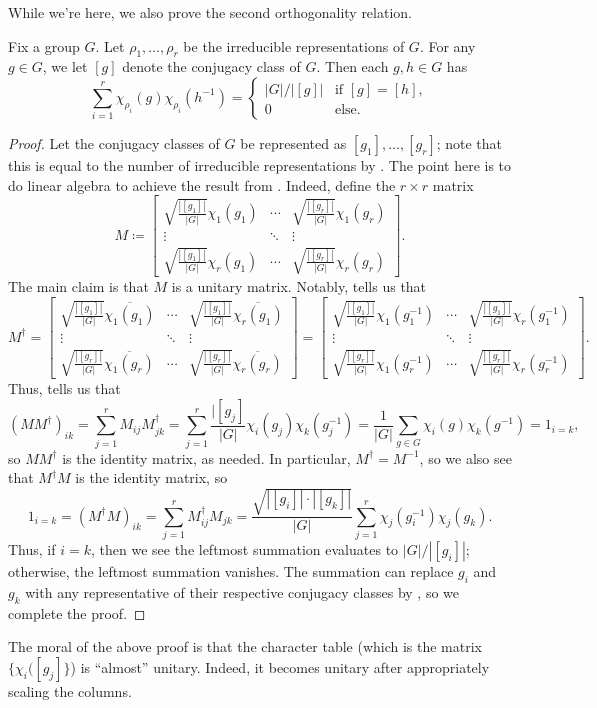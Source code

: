 \documentclass[../main.tex]{subfiles}
\begin{document}
While we're here, we also prove the second orthogonality relation.
\begin{corollary}
	Fix a group $G$. Let $\rho_1,\ldots,\rho_r$ be the irreducible representations of $G$. For any $g\in G$, we let $[g]$ denote the conjugacy class of $G$. Then each $g,h\in G$ has
	\[\sum_{i=1}^r\chi_{\rho_i}(g)\chi_{\rho_i}\left(h^{-1}\right)=\begin{cases}
		|G|/|[g]| & \text{if }[g]=[h], \\
		0 & \text{else}.
	\end{cases}\]
\end{corollary}
\begin{proof}
	Let the conjugacy classes of $G$ be represented as $[g_1],\ldots,[g_r]$; note that this is equal to the number of irreducible representations by . The point here is to do linear algebra to achieve the result from . Indeed, define the $r\times r$ matrix
	\[M\coloneqq\begin{bmatrix}
		\sqrt{\frac{|[g_1]|}{|G|}}\chi_1(g_1) & \cdots & \sqrt{\frac{|[g_r]|}{|G|}}\chi_1(g_r) \\
		\vdots & \ddots & \vdots \\
		\sqrt{\frac{|[g_1]|}{|G|}}\chi_r(g_1) & \cdots & \sqrt{\frac{|[g_r]|}{|G|}}\chi_r(g_r)
	\end{bmatrix}.\]
	The main claim is that $M$ is a unitary matrix. Notably,  tells us that
	\[M^\dagger=\begin{bmatrix}
		\sqrt{\frac{|[g_1]|}{|G|}}\overline{\chi_1(g_1)} & \cdots & \sqrt{\frac{|[g_1]|}{|G|}}\overline{\chi_r(g_1)} \\
		\vdots & \ddots & \vdots \\
		\sqrt{\frac{|[g_r]|}{|G|}}\overline{\chi_1(g_r)} & \cdots & \sqrt{\frac{|[g_r]|}{|G|}}\overline{\chi_r(g_r)}
	\end{bmatrix}=\begin{bmatrix}
		\sqrt{\frac{|[g_1]|}{|G|}}{\chi_1\left(g_1^{-1}\right)} & \cdots & \sqrt{\frac{|[g_1]|}{|G|}}{\chi_r\left(g_1^{-1}\right)} \\
		\vdots & \ddots & \vdots \\
		\sqrt{\frac{|[g_r]|}{|G|}}{\chi_1\left(g_r^{-1}\right)} & \cdots & \sqrt{\frac{|[g_r]|}{|G|}}{\chi_r\left(g_r^{-1}\right)}
	\end{bmatrix}.\]
	Thus,  tells us that
	\[(MM^\dagger)_{ik}=\sum_{j=1}^rM_{ij}M_{jk}^\dagger=\sum_{j=1}^r\frac{|[g_j]}{|G|}\chi_i(g_j)\chi_k\left(g_j^{-1}\right)=\frac1{|G|}\sum_{g\in G}\chi_i(g)\chi_k(g^{-1})=1_{i=k},\]
	so $MM^\dagger$ is the identity matrix, as needed. In particular, $M^\dagger=M^{-1}$, so we also see that $M^\dagger M$ is the identity matrix, so
	\[1_{i=k}=(M^\dagger M)_{ik}=\sum_{j=1}^rM^\dagger_{ij}M_{jk}=\frac{\sqrt{|[g_i]|\cdot|[g_k]|}}{|G|}\sum_{j=1}^r\chi_j(g_i^{-1})\chi_j(g_k).\]
	Thus, if $i=k$, then we see the leftmost summation evaluates to $|G|/|[g_i]|$; otherwise, the leftmost summation vanishes. The summation can replace $g_i$ and $g_k$ with any representative of their respective conjugacy classes by , so we complete the proof.
\end{proof}
\begin{remark}
	The moral of the above proof is that the character table (which is the matrix $\{\chi_i([g_j]\}$) is ``almost'' unitary. Indeed, it becomes unitary after appropriately scaling the columns.
\end{remark}
\end{document}
